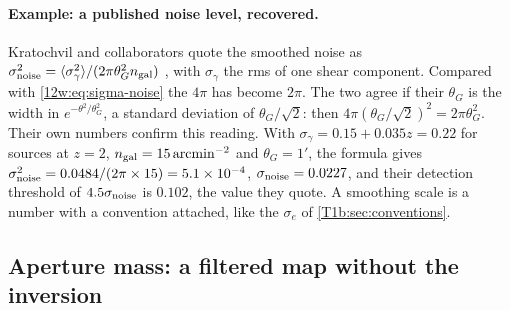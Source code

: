 \paragraph{Example: a published noise level, recovered.}
Kratochvil and collaborators quote the smoothed noise as $\sigma_{\rm noise}^2=\langle\sigma_\gamma^2\rangle/
(2\pi\theta_G^2n_{\rm gal})$ \cite[eq.~9]{Kratochvil2010}, with $\sigma_\gamma$ the rms of one shear component.
Compared with \eqref{12w:eq:sigma-noise} the $4\pi$ has become $2\pi$. The two agree if their $\theta_G$ is the
width in $e^{-\theta^2/\theta_G^2}$, a standard deviation of $\theta_G/\sqrt2$: then $4\pi(\theta_G/\sqrt2)^2=
2\pi\theta_G^2$. Their own numbers confirm this reading. With $\sigma_\gamma=0.15+0.035z=0.22$ for sources at
$z=2$, $n_{\rm gal}=15\,\mathrm{arcmin}^{-2}$ and $\theta_G=1'$, the formula gives $\sigma_{\rm noise}^2=0.0484/
(2\pi\times15)=5.1\times10^{-4}$, $\sigma_{\rm noise}=0.0227$, and their detection threshold of $4.5\sigma_{\rm
noise}$ is $0.102$, the value they quote. A smoothing scale is a number with a convention attached, like the
$\sigma_e$ of \cref{T1b:sec:conventions}.

\subsection{Aperture mass: a filtered map without the inversion}
\label{12w:sec:aperture}

